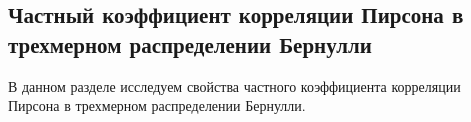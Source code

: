 \begin{centering}
    \subsection{Частный коэффициент корреляции Пирсона в трехмерном распределении Бернулли}\label{partial_section}
\end{centering}
В данном разделе исследуем свойства частного коэффициента корреляции Пирсона
в трехмерном распределении Бернулли.

